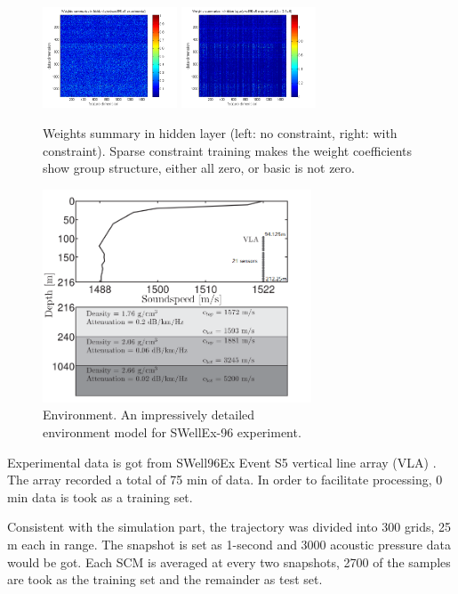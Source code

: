 \begin{figure}
\includegraphics[width=4cm,height=3cm]{figure/Weights_summaries_in_hidden_laye_swell_exp}
\includegraphics[width=4cm,height=3cm]{figure/Weights_summaries_in_hidden_layer_swell_exp_lambda_2_dot_1e_neg_5}
\caption{Weights summary in hidden layer (left: no constraint, right: with constraint). Sparse constraint
training makes the weight coefficients show group structure, either all zero, or basic is not zero.}
\end{figure}
\begin{figure}
\includegraphics[width=8cm]{figure/environment}
\caption{Environment. An impressively detailed \\environment model for SWellEx-96 experiment.}
\end{figure}
Experimental data is got from SWell96Ex Event S5 vertical line array (VLA) . The array recorded a total of 75 min of data. In order to facilitate processing, 0 min data is took as a training set.

Consistent with the simulation part, the trajectory was divided into 300 grids, 25 m each in range. The snapshot is set as 1-second and 3000 acoustic pressure data would be got. Each SCM is averaged at every two snapshots, 2700 of the samples are took as the training set and the remainder as test set.

